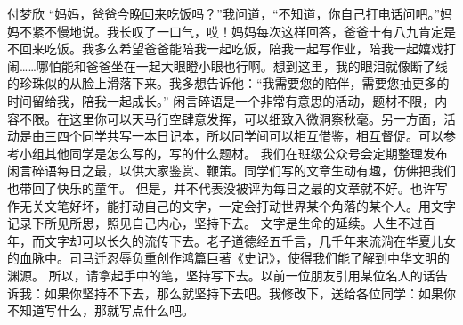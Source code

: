{}\markdownRendererInterblockSeparator
{}付梦欣\markdownRendererInterblockSeparator
{}“妈妈，爸爸今晚回来吃饭吗？”我问道，“不知道，你自己打电话问吧。”妈妈不紧不慢地说。我长叹了一口气，哎！妈妈每次这样回答，爸爸十有八九肯定是不回来吃饭。我多么希望爸爸能陪我一起吃饭，陪我一起写作业，陪我一起嬉戏打闹……哪怕能和爸爸坐在一起大眼瞪小眼也行啊。想到这里，我的眼泪就像断了线的珍珠似的从脸上滑落下来。我多想告诉他：“我需要您的陪伴，需要您抽更多的时间留给我，陪我一起成长。”\markdownRendererInterblockSeparator
{}\markdownRendererInterblockSeparator
{}闲言碎语是一个非常有意思的活动，题材不限，内容不限。在这里你可以天马行空肆意发挥，可以细致入微洞察秋毫。另一方面，活动是由三四个同学共写一本日记本，所以同学间可以相互借鉴，相互督促。可以参考小组其他同学是怎么写的，写的什么题材。\markdownRendererInterblockSeparator
{}我们在班级公众号会定期整理发布闲言碎语每日之最，以供大家鉴赏、鞭策。同学们写的文章生动有趣，仿佛把我们也带回了快乐的童年。\markdownRendererInterblockSeparator
{}但是，并不代表没被评为每日之最的文章就不好。也许写作无关文笔好坏，能打动自己的文字，一定会打动世界某个角落的某个人。用文字记录下所见所思，照见自己内心，坚持下去。\markdownRendererInterblockSeparator
{}文字是生命的延续。人生不过百年，而文字却可以长久的流传下去。老子道德经五千言，几千年来流淌在华夏儿女的血脉中。司马迁忍辱负重创作鸿篇巨著《史记》，使得我们能了解到中华文明的渊源。\markdownRendererInterblockSeparator
{}所以，请拿起手中的笔，坚持写下去。以前一位朋友引用某位名人的话告诉我：如果你坚持不下去，那么就坚持下去吧。我修改下，送给各位同学：如果你不知道写什么，那就写点什么吧。\markdownRendererDocumentEnd